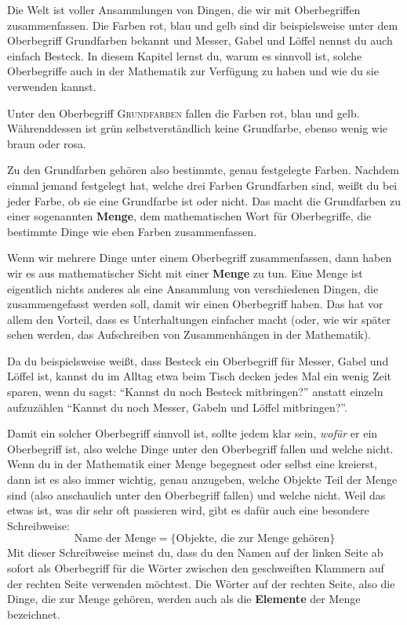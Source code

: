 \documentclass[../../main.tex]{subfiles}
\begin{document}
Die Welt ist voller Ansammlungen von Dingen, die wir mit Oberbegriffen zusammenfassen. Die Farben rot, blau und gelb sind dir beispielsweise unter dem Oberbegriff Grundfarben bekannt und Messer, Gabel und Löffel nennst du auch einfach Besteck. In diesem Kapitel lernst du, warum es sinnvoll ist, solche Oberbegriffe auch in der Mathematik zur Verfügung zu haben und wie du sie verwenden kannst.

\begin{example}{}
    Unter den Oberbegriff \textsc{Grundfarben} fallen die Farben rot, blau und gelb. Währenddessen ist grün selbstverständlich keine Grundfarbe, ebenso wenig wie braun oder rosa.

    Zu den Grundfarben gehören also bestimmte, genau festgelegte Farben. Nachdem einmal jemand festgelegt hat, welche drei Farben Grundfarben sind, weißt du bei jeder Farbe, ob sie eine Grundfarbe ist oder nicht. Das macht die Grundfarben zu einer sogenannten \textbf{Menge}, dem mathematischen Wort für Oberbegriffe, die bestimmte Dinge wie eben Farben zusammenfassen.
\end{example}

Wenn wir mehrere Dinge unter einem Oberbegriff zusammenfassen, dann haben wir es aus mathematischer Sicht mit einer \textbf{Menge} zu tun. Eine Menge ist eigentlich nichts anderes als eine Ansammlung von verschiedenen Dingen, die zusammengefasst werden soll, damit wir einen Oberbegriff haben. Das hat vor allem den Vorteil, dass es Unterhaltungen einfacher macht (oder, wie wir später sehen werden, das Aufschreiben von Zusammenhängen in der Mathematik). 

Da du beispielsweise weißt, dass Besteck ein Oberbegriff für Messer, Gabel und Löffel ist, kannst du im Alltag etwa beim Tisch decken jedes Mal ein wenig Zeit sparen, wenn du sagst: \enquote{Kannst du noch Besteck mitbringen?} anstatt einzeln aufzuzählen \enquote{Kannst du noch Messer, Gabeln und Löffel mitbringen?}.

Damit ein solcher Oberbegriff sinnvoll ist, sollte jedem klar sein, \emph{wofür} er ein Oberbegriff ist, also welche Dinge unter den Oberbegriff fallen und welche nicht. Wenn du in der Mathematik einer Menge begegnest oder selbst eine kreierst, dann ist es also immer wichtig, genau anzugeben, welche Objekte Teil der Menge sind (also anschaulich unter den Oberbegriff fallen) und welche nicht. Weil das etwas ist, was dir sehr oft passieren wird, gibt es dafür auch eine besondere Schreibweise:
\[\text{Name der Menge}=\{\text{Objekte, die zur Menge gehören}\}\]
Mit dieser Schreibweise meinst du, dass du den Namen auf der linken Seite ab sofort als Oberbegriff für die Wörter zwischen den geschweiften Klammern auf der rechten Seite verwenden möchtest. Die Wörter auf der rechten Seite, also die Dinge, die zur Menge gehören, werden auch als die \textbf{Elemente} der Menge bezeichnet.
\end{document}
